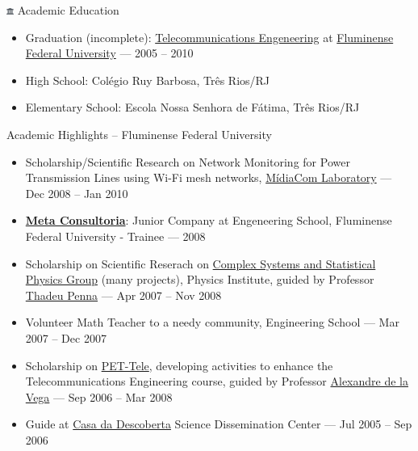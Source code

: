 \documentclass[a4paper,11pt]{article}
\begin{document}
\begin{section}{\includegraphics[height=0.6em]{icon-university} Academic Education}
	\begin{itemize}
		\item Graduation (incomplete):
			\href{http://telecom.uff.br/}{Telecommunications Engeneering} at
			\href{http://www.uff.br/}{Fluminense Federal University} ---
			2005 -- 2010
		\item High School: Colégio Ruy Barbosa, Três Rios/RJ
		\item Elementary School: Escola Nossa Senhora de Fátima, Três Rios/RJ
	\end{itemize}

	\begin{subsection}{Academic Highlights -- Fluminense Federal University}
		\begin{itemize}
			\item Scholarship/Scientific Research on Network Monitoring for
				Power Transmission Lines using Wi-Fi mesh networks,
				\href{http://www.midiacom.uff.br/ }{MídiaCom Laboratory} ---
				Dec 2008 -- Jan 2010
			\item \href{http://www.metaconsultoria.com/}{\textbf{Meta
				Consultoria}}: Junior Company at Engeneering School, Fluminense
				Federal University - Trainee --- 2008
			\item Scholarship on Scientific Reserach on
				\href{http://complex.if.uff.br/}{Complex Systems and Statistical
				Physics Group} (many projects), Physics Institute, guided by
				Professor \href{http://profs.if.uff.br/tjpp/}{Thadeu Penna} ---
				Apr 2007 -- Nov 2008
			\item Volunteer Math Teacher to a needy community, Engineering
				School --- Mar 2007 -- Dec 2007
			\item Scholarship on \href{http://pet.telecom.uff.br/}{PET-Tele},
				developing activities to enhance the Telecommunications
				Engineering course, guided by Professor
				\href{http://www.telecom.uff.br/~delavega/}{Alexandre de la
				Vega} --- Sep 2006 -- Mar 2008
			\item Guide at \href{http://www.uff.br/casadadescoberta/}{Casa da
				Descoberta} Science Dissemination Center --- Jul 2005 -- Sep
				2006
		\end{itemize}
	\end{subsection}
\end{section}
\end{document}
